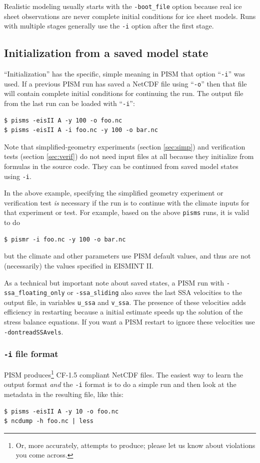 Realistic modeling usually starts with the \texttt{-boot_file} option because real ice sheet observations are never complete initial conditions for ice sheet models.  Runs with multiple stages generally use the \texttt{-i} option after the first stage.

\subsection{Initialization from a saved model state}  ``Initialization'' has the specific, simple meaning in PISM that option ``\texttt{-i}'' was used.  If a previous PISM run has saved a NetCDF file using ``\texttt{-o}'' then that file will contain complete initial conditions for continuing the run.  The output file from the last run can be loaded with ``\texttt{-i}'': 

\begin{verbatim}
$ pisms -eisII A -y 100 -o foo.nc
$ pisms -eisII A -i foo.nc -y 100 -o bar.nc
\end{verbatim}
\smallskip

Note that simplified-geometry experiments (section \ref{sec:simp}) and verification tests (section \ref{sec:verif}) do not need input files at all because they initialize from formulas in the source code.  They can be continued from saved model states using \texttt{-i}.

In the above example, specifying the simplified geometry experiment or verification test \emph{is} necessary if the run is to continue with the climate inputs for that experiment or test.  For example, based on the above \texttt{pisms} runs, it is valid to do
\begin{verbatim}
$ pismr -i foo.nc -y 100 -o bar.nc
\end{verbatim}
but the climate and other parameters use PISM default values, and thus are not (necessarily) the values specified in EISMINT II.

As a technical but important note about saved states, a PISM run with \texttt{-ssa_floating_only} or \texttt{-ssa_sliding}
also saves the last SSA velocities to the output file, in variables 
\texttt{u_ssa} and \texttt{v_ssa}.  The presence
of these velocities adds efficiency in restarting because a initial estimate speeds up the solution of the stress balance equations.  If you want a PISM restart to
ignore these velocities use \texttt{-dontreadSSAvels}.

\subsubsection*{\texttt{-i} file format}
\label{sec:i-format}
PISM produces\footnote{Or, more accurately, attempts to produce; please let us know about violations you come across.} CF-1.5 compliant NetCDF files.  The easiest way to learn the output format \emph{and} the \texttt{-i} format is to do a simple run and then look at the metadata in the resulting file, like this:
\begin{verbatim}
$ pisms -eisII A -y 10 -o foo.nc
$ ncdump -h foo.nc | less
\end{verbatim}

